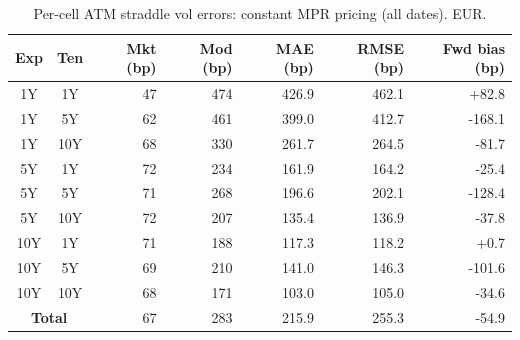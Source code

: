 \begin{table}[H]
\centering
\caption{Per-cell ATM straddle vol errors: constant MPR pricing (all dates). EUR.}
\label{tab:constant_mpr_consistent_per_cell_all}
\small
\begin{tabular}{@{}ccrrrrr@{}}
\toprule
\textbf{Exp} & \textbf{Ten} & \textbf{Mkt (bp)} & \textbf{Mod (bp)} & \textbf{MAE (bp)} & \textbf{RMSE (bp)} & \textbf{Fwd bias (bp)} \\
\midrule
  1Y & 1Y & 47 & 474 & 426.9 & 462.1 & +82.8 \\
  1Y & 5Y & 62 & 461 & 399.0 & 412.7 & -168.1 \\
  1Y & 10Y & 68 & 330 & 261.7 & 264.5 & -81.7 \\
  \midrule
  5Y & 1Y & 72 & 234 & 161.9 & 164.2 & -25.4 \\
  5Y & 5Y & 71 & 268 & 196.6 & 202.1 & -128.4 \\
  5Y & 10Y & 72 & 207 & 135.4 & 136.9 & -37.8 \\
  \midrule
  10Y & 1Y & 71 & 188 & 117.3 & 118.2 & +0.7 \\
  10Y & 5Y & 69 & 210 & 141.0 & 146.3 & -101.6 \\
  10Y & 10Y & 68 & 171 & 103.0 & 105.0 & -34.6 \\
  \midrule
  \multicolumn{2}{c}{\textbf{Total}} & 67 & 283 & 215.9 & 255.3 & -54.9 \\
\bottomrule
\end{tabular}
\end{table}